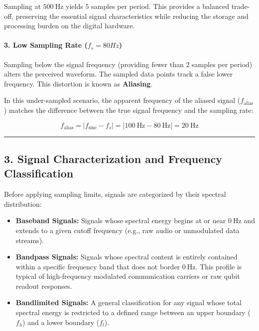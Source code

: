 \documentclass[
]{article}
\providecommand{\tightlist}{%
  \setlength{\itemsep}{0pt}\setlength{\parskip}{0pt}}
\begin{document}
Sampling at \(500\ \text{Hz}\) yields \(5\) samples per period. This
provides a balanced trade-off, preserving the essential signal
characteristics while reducing the storage and processing burden on the
digital hardware.

\paragraph{\texorpdfstring{3. Low Sampling Rate
(\(f_s = 80Hz\))}{3. Low Sampling Rate (f\_s = 80Hz)}}\label{low-sampling-rate-f_s-80hz}

Sampling below the signal frequency (providing fewer than \(2\) samples
per period) alters the perceived waveform. The sampled data points track
a false lower frequency. This distortion is known as \textbf{Aliasing}.

In this under-sampled scenario, the apparent frequency of the aliased
signal (\(f_{\text{alias}}\)) matches the difference between the true
signal frequency and the sampling rate:

\[f_{\text{alias}} = |f_{\text{sine}} - f_s| = |100\ \text{Hz} - 80\ \text{Hz}| = 20\ \text{Hz}\]

\begin{center}\rule{0.5\linewidth}{0.5pt}\end{center}

\subsection{3. Signal Characterization and Frequency
Classification}\label{signal-characterization-and-frequency-classification}

Before applying sampling limits, signals are categorized by their
spectral distribution:

\begin{itemize}
\tightlist
\item
  \textbf{Baseband Signals:} Signals whose spectral energy begins at or
  near \(0\ \text{Hz}\) and extends to a given cutoff frequency (e.g.,
  raw audio or unmodulated data streams).
\item
  \textbf{Bandpass Signals:} Signals whose spectral content is entirely
  contained within a specific frequency band that does not border
  \(0\ \text{Hz}\). This profile is typical of high-frequency modulated
  communication carriers or raw qubit readout responses.
\item
  \textbf{Bandlimited Signals:} A general classification for any signal
  whose total spectral energy is restricted to a defined range between
  an upper boundary (\(f_h\)) and a lower boundary (\(f_l\)).
\end{itemize}
\end{document}
